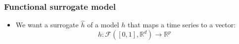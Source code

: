 \documentclass{beamer}
\begin{document}
\begin{frame}
  \frametitle{Functional surrogate model}
  
  \small
      \begin{itemize}
        \item We want a surrogate $\hat{h}$ of a model $h$ that maps a time series to a vector:
        \begin{equation*}
          h: \mathcal{F}([0, 1], \mathbb{R}^d) \rightarrow \mathbb{R}^p
        \end{equation*}
      \end{itemize}
  \vspace{-0.7cm}
  \begin{columns}

\end{columns}
\end{frame}
\end{document}

